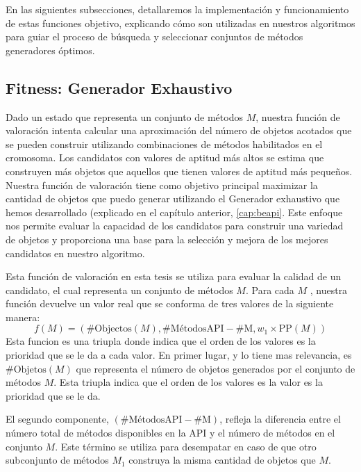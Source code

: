En las siguientes subsecciones, detallaremos la implementación y funcionamiento de estas funciones objetivo, explicando cómo son utilizadas en nuestros algoritmos para guiar el proceso de búsqueda y seleccionar conjuntos de métodos generadores óptimos.

\subsection{Fitness: Generador Exhaustivo}

Dado un estado que representa un conjunto de métodos $M$, nuestra función de valoración intenta calcular una aproximación del número de objetos acotados que se pueden construir utilizando combinaciones de métodos habilitados en el cromosoma. Los candidatos con valores de aptitud más altos se estima que construyen más objetos que aquellos que tienen valores de aptitud más pequeños.
Nuestra función de valoración tiene como objetivo principal maximizar la cantidad de objetos que puedo generar utilizando el Generador exhaustivo que hemos desarrollado (explicado en el capítulo anterior,  \ref{cap:beapi}. Este enfoque nos permite evaluar la capacidad de los candidatos para construir una variedad de objetos y proporciona una base para la selección y mejora de los mejores candidatos en nuestro algoritmo.

Esta función de valoración en esta tesis se utiliza para evaluar la calidad de un candidato, el cual representa un conjunto de métodos $M$. Para cada $M$ , nuestra función devuelve un valor real que se conforma de tres valores de la siguiente manera:
\begin{equation*}
f(M) = (\text{{\#Objectos}}(M), \text{{\#MétodosAPI}} - \text{{\#M}}, w_1 \times \text{{PP}}(M))
\end{equation*}
Esta funcion es una triupla donde indica que el orden de los valores es la prioridad que se le da a cada valor. 
En primer lugar, y lo tiene mas relevancia, es $\text{{\#Objetos}}(M)$ que representa el número de objetos generados por el conjunto de métodos $M$. Esta triupla indica que el orden de los valores es la  valor es la prioridad que se le da.

El segundo componente, $(\text{{\#MétodosAPI}} - \text{{\#M}})$, refleja la diferencia entre el número total de métodos disponibles en la API y el número de métodos en el conjunto $M$. Este término se utiliza para desempatar en caso de que otro subconjunto de métodos $M_1$ construya la misma cantidad de objetos que $M$.


